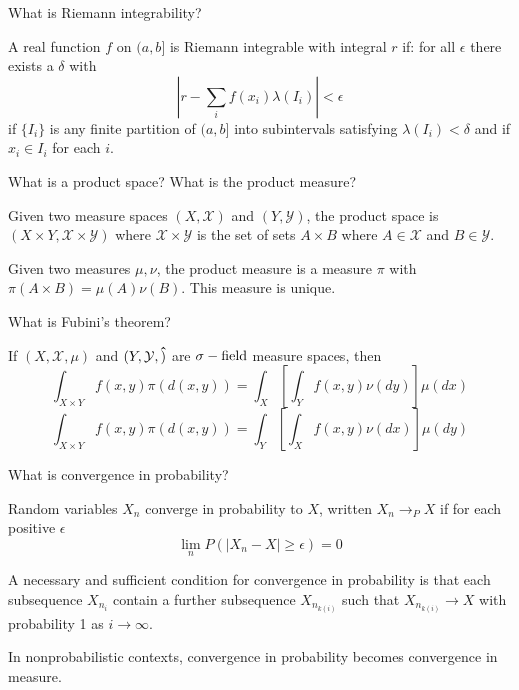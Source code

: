 \documentclass[avery5388,grid,frame]{flashcards}
\begin{document}
\begin{flashcard}
    {What is Riemann integrability?}
    \begin{definition}
        A real function $f$ on $(a,b]$ is Riemann integrable with integral $r$ if: for all $\epsilon$ there exists a $\delta$ with
        $$| r - \sum_i f(x_i) \lambda(I_i) | < \epsilon$$
        if $\{ I_i \}$ is any finite partition of $(a,b]$ into subintervals satisfying $\lambda(I_i) < \delta$ and if $x_i \in I_i$ for each $i$.
    \end{definition}
\end{flashcard}


\begin{flashcard}
    {What is a product space? What is the product measure?}
    \begin{definition}
        Given two measure spaces $(X,\mathcal X)$ and $(Y,\mathcal Y)$, the product space is $(X \times Y, \mathcal X \times \mathcal Y)$ where $\mathcal X \times \mathcal Y$ is the set of sets $A \times B$ where $A \in \mathcal X$ and $B \in \mathcal Y$.
    \end{definition}

    \begin{definition}
        Given two measures $\mu, \nu$, the product measure is a measure $\pi$ with $\pi(A \times B) = \mu(A) \nu(B)$. This measure is unique.
    \end{definition}
\end{flashcard}


\begin{flashcard}
    {What is Fubini's theorem?}
    \begin{theorem}
        If $(X, \mathcal X, \mu)$ and $(Y, \mathcal Y, \vu)$ are $\sigma-\text{field}$ measure spaces, then
        $$\int_{X \times Y} f(x,y) \pi(d(x,y)) = \int_X \left [ \int_Y f(x,y) \nu(dy) \right ] \mu(dx)$$
        $$\int_{X \times Y} f(x,y) \pi(d(x,y)) = \int_Y \left [ \int_X f(x,y) \nu(dx) \right ] \mu(dy)$$
    \end{theorem}
\end{flashcard}


\begin{flashcard}
    {What is convergence in probability?}
    \begin{definition}
        Random variables $X_n$ converge in probability to $X$, written $X_n \rightarrow_P X$ if for each positive $\epsilon$
        $$\lim_n P(|X_n - X| \geq \epsilon) = 0$$
    \end{definition}

    \begin{theorem}
        A necessary and sufficient condition for convergence in probability is that each subsequence $X_{n_i}$ contain a further subsequence $X_{n_{k(i)}}$ such that $X_{n_{k(i)}} \rightarrow X$ with probability 1 as $i \rightarrow \infty$.
    \end{theorem}

    \begin{remark}
        In nonprobabilistic contexts, convergence in probability becomes convergence in measure.
    \end{remark}
\end{flashcard}
\end{document}
